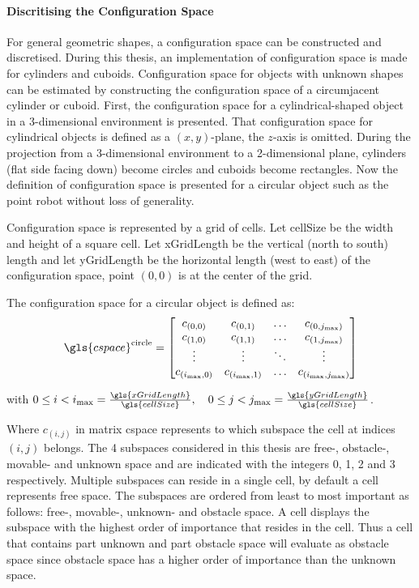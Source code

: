 \paragraph{Discritising the Configuration Space}
For general geometric shapes, a configuration space can be constructed and discretised. During this thesis, an implementation of configuration space is made for cylinders and cuboids. Configuration space for objects with unknown shapes can be estimated by constructing the configuration space of a circumjacent cylinder or cuboid. First, the configuration space for a cylindrical-shaped object in a 3-dimensional environment is presented. That configuration space for cylindrical objects is defined as a $(x, y)$-plane, the $z$-axis is omitted. During the projection from a 3-dimensional environment to a 2-dimensional plane, cylinders (flat side facing down) become circles and cuboids become rectangles. Now the definition of configuration space is presented for a circular object such as the point robot without loss of generality.\bs

Configuration space is represented by a grid of cells. Let \gls{cellSize} be the width and height of a square cell. Let \gls{xGridLength} be the vertical (north to south) length and let \gls{yGridLength} be the horizontal length (west to east) of the configuration space, point $(0, 0)$ is at the center of the grid.\bs

The configuration space for a circular object is defined as:\bs
\[ \gls{cspace}^{\textrm{circle}} = 
\begin{bmatrix}
  c_{(0,0)} & c_{(0,1)} & \hdots & c_{(0,j_{\textrm{max}})}\\
  c_{(1,0)} & c_{(1,1)} & \hdots & c_{(1,j_{\textrm{max}})}\\
  \vdots &  \vdots & \ddots & \vdots\\
  c_{(i_{\textrm{max}},0)} & c_{(i_{\textrm{max}},1)} & \hdots & c_{(i_{\textrm{max}},j_{\textrm{max}})}\\
\end{bmatrix}
\]

with $0 \leq i < i_{\textrm{max}} = \frac{\gls{xGridLength}}{\gls{cellSize}}, \quad 0 \leq j < j_{\textrm{max}} = \frac{\gls{yGridLength}}{\gls{cellSize}}$.\bs

Where $c_{(i,j)}$ in matrix \gls{cspace} represents to which subspace the cell at indices $(i, j)$ belongs. The 4 subspaces considered in this thesis are free-, obstacle-, movable- and unknown space and are indicated with the integers 0, 1, 2 and 3 respectively. Multiple subspaces can reside in a single cell, by default a cell represents free space. The subspaces are ordered from least to most important as follows: free-, movable-, unknown- and obstacle space. A cell displays the subspace with the highest order of importance that resides in the cell. Thus a cell that contains part unknown and part obstacle space will evaluate as obstacle space since obstacle space has a higher order of importance than the unknown space.\bs


